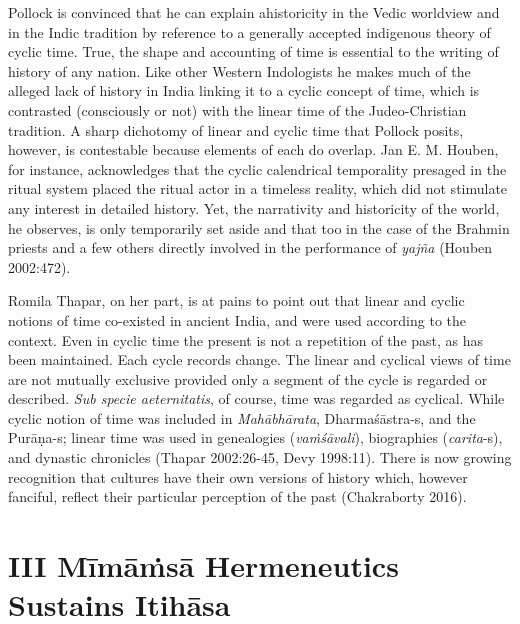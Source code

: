 Pollock is convinced that he can explain ahistoricity in the Vedic worldview and in the Indic tradition by reference to a generally accepted indigenous theory of cyclic time. True, the shape and accounting of time is essential to the writing of history of any nation. Like other Western Indologists he makes much of the alleged lack of history in India linking it to a cyclic concept of time, which is contrasted (consciously or not) with the linear time of the Judeo-Christian tradition. A sharp dichotomy of linear and cyclic time that Pollock posits, however, is contestable because elements of each do overlap. Jan E. M. Houben, for instance, acknowledges that the cyclic calendrical temporality presaged in the ritual system placed the ritual actor in a timeless reality, which did not stimulate any interest in detailed history. Yet, the narrativity and historicity of the world, he observes, is only temporarily set aside and that too in the case of the Brahmin priests and a few others directly involved in the performance of \textit{yajña} (Houben 2002:472).

Romila Thapar, on her part, is at pains to point out that linear and cyclic notions of time co-existed in ancient India, and were used according to the context. Even in cyclic time  the present is not a repetition of the past, as has been maintained. Each cycle records change. The linear and cyclical views of time are not mutually exclusive provided only a segment of the cycle is regarded or described. \textit{Sub specie aeternitatis}, of course, time was regarded as cyclical. While cyclic notion of time was included in \textit{Mahābhārata}, Dharmaśāstra-s, and the Purāṇa-s; linear time was used in genealogies (\textit{vaṁśāvali}), biographies (\textit{carita}-s), and dynastic chronicles (Thapar 2002:26-45, Devy 1998:11). There is now growing recognition that cultures have their own versions of history which, however fanciful, reflect their particular perception of the past (Chakraborty 2016).


\section*{III Mīmāṁsā Hermeneutics Sustains Itihāsa}

